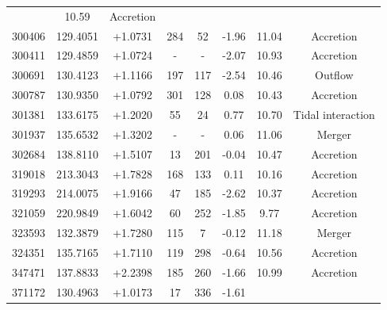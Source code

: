 \documentclass[fleqn,usenatbib]{mnras}
\begin{document}
\begin{table}
\begin{tabular*}{\linewidth}{cccccccc}
& 10.59%
& Accretion          \\
300406                    & 129.4051 & +1.0731 & 284                           & 52                          & -1.96%
& 11.04%
& Accretion          \\
300411                    & 129.4859 & +1.0724 & -                           & -                         & -2.07%
& 10.93%
& Accretion          \\
300691                    & 130.4123 & +1.1166 & 197                           & 117                         & -2.54%
& 10.46%
& Outflow             \\
300787                    & 130.9350 & +1.0792 & 301                           & 128                         & 0.08%
& 10.43%
& Accretion          \\
301381                    & 133.6175 & +1.2020 & 55                            & 24                          & 0.77%
& 10.70%
& Tidal interaction  \\
301937                    & 135.6532 & +1.3202 & -                           & -                         & 0.06%
& 11.06%
& Merger             \\
302684                    & 138.8110 & +1.5107 & 13                            & 201                         & -0.04%
& 10.47%
& Accretion          \\
319018                    & 213.3043 & +1.7828 & 168                           & 133                         & 0.11%
& 10.16%
& Accretion          \\
319293                    & 214.0075 & +1.9166 & 47                            & 185                         & -2.62%
& 10.37%
& Accretion          \\
321059                    & 220.9849 & +1.6042 & 60                            & 252                         & -1.85%
& 9.77%
& Accretion          \\
323593                    & 132.3879 & +1.7280 & 115                           & 7                           & -0.12%
& 11.18%
& Merger             \\
324351                    & 135.7165 & +1.7110 & 119                           & 298                         & -0.64%
& 10.56%
& Accretion          \\
347471                    & 137.8833 & +2.2398 & 185                           & 260                         & -1.66%
& 10.99%
& Accretion          \\
371172                    & 130.4963 & +1.0173 & 17                            & 336                         & -1.61%

\end{tabular*}
\end{table}
\end{document}
